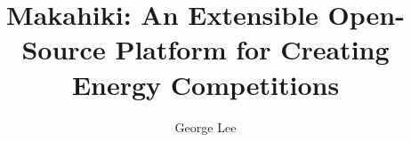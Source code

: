 \documentclass[11pt,final,thesis,actual]{uhthesis2e}
\begin{document}
\title{Makahiki: An Extensible Open-Source Platform for Creating Energy Competitions}
\author{George Lee}

\maketitle

\begin{frontmatter}

\signaturepage

\copyrightpage







\tableofcontents

\listoftables

\listoffigures

\end{frontmatter}
\end{document}
